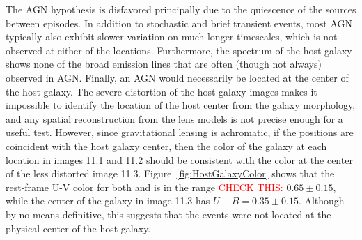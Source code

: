 The AGN hypothesis is disfavored principally due to the quiescence of
the \spock sources between episodes. In addition to stochastic and
brief transient events, most AGN typically also exhibit slower
variation on much longer timescales, which is not observed at either
of the \spock locations. Furthermore, the spectrum of the \spock host
galaxy shows none of the broad emission lines that are often (though
not always) observed in AGN.  Finally, an AGN would necessarily be
located at the center of the host galaxy. The severe distortion of the
host galaxy images makes it impossible to identify the location of the
host center from the galaxy morphology, and any spatial reconstruction
from the lens models is not precise enough for a useful test.
However, since gravitational lensing is achromatic, if the \spock
positions are coincident with the host galaxy center, then the color
of the galaxy at each \spock location in images 11.1 and 11.2 should
be consistent with the color at the center of the less distorted image
11.3.  Figure~\ref{fig:HostGalaxyColor} shows that the rest-frame U-V
color for both \spockone and \spocktwo is in the range
\textcolor{red}{CHECK THIS:} $0.65\pm0.15$, while the center of the
galaxy in image 11.3 has $U-B=0.35\pm0.15$. Although by no means
definitive, this suggests that the \spock events were not located at
the physical center of the host galaxy.





